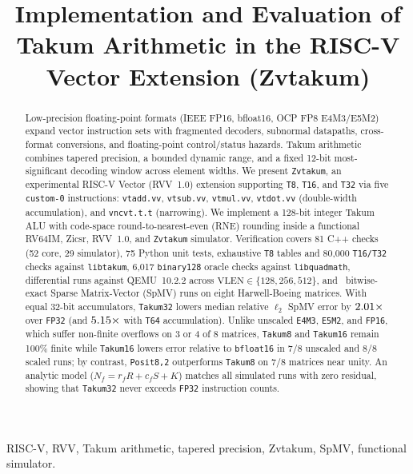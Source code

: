 \documentclass[conference]{IEEEtran}
\author{\IEEEauthorblockN{Andr\'e Lu\'is Alves Rezende, Gabriel Ramos Fontes,
Isadora Maria Carvalho Lopes, Jo\~ao Pedro Santos de Brito}
\IEEEauthorblockA{Department of Electronic Engineering (DELT), Federal University of Minas Gerais (UFMG)\\
Belo Horizonte, MG, Brazil}}
\title{Implementation and Evaluation of Takum Arithmetic in the RISC-V Vector Extension (Zvtakum)}
\begin{document}
\maketitle

\begin{abstract}
Low-precision floating-point formats (IEEE FP16, bfloat16, OCP FP8 E4M3/E5M2) expand vector instruction sets with fragmented decoders, subnormal datapaths, cross-format conversions, and floating-point control/status hazards. Takum arithmetic combines tapered precision, a bounded dynamic range, and a fixed 12-bit most-significant decoding window across element widths. We present \texttt{Zvtakum}, an experimental RISC-V Vector (RVV~1.0) extension supporting \texttt{T8}, \texttt{T16}, and \texttt{T32} via five \texttt{custom-0} instructions: \texttt{vtadd.vv}, \texttt{vtsub.vv}, \texttt{vtmul.vv}, \texttt{vtdot.vv} (double-width accumulation), and \texttt{vncvt.t.t} (narrowing). We implement a 128-bit integer Takum ALU with code-space round-to-nearest-even (RNE) rounding inside a functional RV64IM, Zicsr, RVV~1.0, and \texttt{Zvtakum} simulator. Verification covers 81 C++ checks (52 core, 29 simulator), 75 Python unit tests, exhaustive \texttt{T8} tables and 80,000 \texttt{T16/T32} checks against \texttt{libtakum}, 6,017 \texttt{binary128} oracle checks against \texttt{libquadmath}, differential runs against QEMU~10.2.2 across $\mathrm{VLEN}\in\{128,256,512\}$, and \NumExecSpmv\ bitwise-exact Sparse Matrix-Vector (SpMV) runs on eight Harwell-Boeing matrices. With equal 32-bit accumulators, \texttt{Takum32} lowers median relative $\ell_2$ SpMV error by $2.01\times$ over \texttt{FP32} (and $5.15\times$ with \texttt{T64} accumulation). Unlike unscaled \texttt{E4M3}, \texttt{E5M2}, and \texttt{FP16}, which suffer non-finite overflows on 3 or 4 of 8 matrices, \texttt{Takum8} and \texttt{Takum16} remain 100\% finite while \texttt{Takum16} lowers error relative to \texttt{bfloat16} in 7/8 unscaled and 8/8 scaled runs; by contrast, \texttt{Posit8,2} outperforms \texttt{Takum8} on 7/8 matrices near unity. An analytic model ($N_f = r_f R + c_f S + K$) matches all simulated runs with zero residual, showing that \texttt{Takum32} never exceeds \texttt{FP32} instruction counts.
\end{abstract}

\begin{IEEEkeywords}
RISC-V, RVV, Takum arithmetic, tapered precision, Zvtakum, SpMV, functional simulator.
\end{IEEEkeywords}
\end{document}

